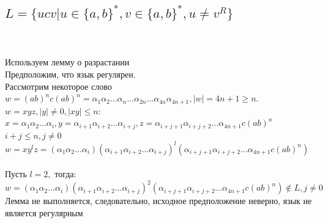\documentclass{article}
\begin{document}
\subsection{$L = \{ ucv  | u \in \{a,b\}^*, v \in \{a,b\}^* , u \ne v^R\} $}\\
\\ Используем лемму о разрастании\\
Предположим, что язык регулярен.\\ Рассмотрим некоторое слово
\\$w =(ab)^nc(ab)^n = \alpha_1 \alpha_2 ... \alpha_n...\alpha_{2n}...\alpha_{4n}\alpha_{4n+1}, |w| = 4n+1 \ge n.$\\
$w = xyz, |y| \ne 0, |xy| \le n:$\\
$x = \alpha_1 \alpha_2...\alpha_i, y = \alpha_{i+1} \alpha_{i+2}...\alpha_{i+j}, z = \alpha_{i+j+1}\alpha_{i+j+2}...\alpha_{4n+1}c(ab)^n$\\
$i + j \le n, j \ne 0 $\\
$w = xy^lz=(\alpha_1 \alpha_2...\alpha_i)(\alpha_{i+1} \alpha_{i+2}...\alpha_{i+j})^l(\alpha_{i+j+1}\alpha_{i+j+2}...\alpha_{4n+1}c(ab)^n)$\\
\\
Пусть $l=2,$ тогда: $w = (\alpha_1 \alpha_2...\alpha_i)(\alpha_{i+1} \alpha_{i+2}...\alpha_{i+j})^2(\alpha_{i+j+1}\alpha_{i+j+2}...\alpha_{4n+1}c(ab)^n) \notin L  ,j \ne 0$\\
Лемма не выполняется, следовательно, исходное предположение неверно, язык не является регулярным\\
\end{document}
